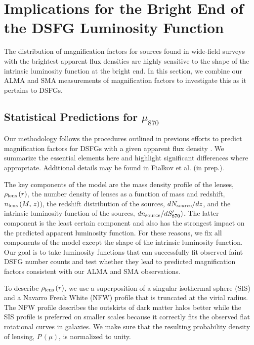 \documentclass[iop]{emulateapj}
\begin{document}
\section{Implications for the Bright End of the DSFG Luminosity
Function}\label{sec:discuss}

The distribution of magnification factors for sources found in wide-field
surveys with the brightest apparent flux densities are highly sensitive to the
shape of the intrinsic luminosity function at the bright end.  In this section,
we combine our ALMA and SMA measurements of magnification factors to investigate
this as it pertains to DSFGs.

\subsection{Statistical Predictions for $\mu_{870}$}\label{sec:statpredict}

Our methodology follows the procedures outlined in previous efforts to predict
magnification factors for DSFGs with a given apparent flux density
\citep[chiefly,][]{Lima:2010fk, Wardlow:2013lr}.  We summarize the essential
elements here and highlight significant differences where appropriate.
Additional details may be found in Fialkov et al. (in prep.).  

The key components of the model are the mass density profile of the lenses,
$\rho_{\rm lens}\,(r)$, the number density of lenses as a function of mass and
redshift, $n_{\rm lens}\,(M, \, z)$), the redshift distribution of the sources,
$dN_{\rm source}/dz$, and the intrinsic luminosity function of the sources,
$dn_{\rm source}/dS_{870}^\prime)$.  The latter component is the least certain
component and also has the strongest impact on the predicted apparent
luminosity function.  For these reasons, we fix all components of the model
except the shape of the intrinsic luminosity function.  Our goal is to take
luminosity functions that can successfully fit observed faint DSFG number
counts \citep{Karim:2013lr} and test whether they lead to predicted
magnification factors consistent with our ALMA and SMA observations.

To describe $\rho_{\rm lens}\,(r)$, we use a superposition of a singular
isothermal sphere (SIS) and a Navarro Frenk White (NFW) profile
\citep{Navarro:1997ys} that is truncated at the virial radius.  The NFW profile
describes the outskirts of dark matter halos better while the SIS profile is
preferred on smaller scales because it correctly fits the observed flat
rotational curves in galaxies.  We make sure that the resulting probability
density of lensing, $P\,(\mu)$, is normalized to unity. 
\end{document}
